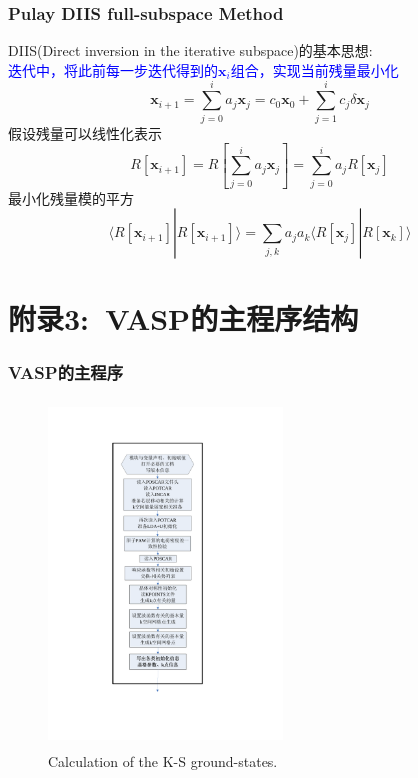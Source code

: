 \documentclass[cjk,slidestop,compress,mathserif,blue]{beamer}
\begin{document}
\frame
{
	\frametitle{\textrm{Pulay DIIS full-subspace Method}}
	\textrm{DIIS(Direct inversion in the iterative subspace)}的基本思想:~\\
	\textcolor{blue}{迭代中，将此前每一步迭代得到的$\mathbf{x}_i$组合，实现当前残量最小化}
	\begin{displaymath}
		\mathbf{x}_{i+1}=\sum_{j=0}^ia_j\mathbf{x}_{j}=c_0\mathbf{x}_0+\sum_{j=1}^ic_j\delta\mathbf{x}_{j}
	\end{displaymath}
	假设残量可以线性化表示
	\begin{displaymath}
		R[\mathbf{x}_{i+1}]=R[\sum_{j=0}^ia_j\mathbf{x}_{j}]=\sum_{j=0}^ia_jR[\mathbf{x}_{j}]
	\end{displaymath}
	最小化残量模的平方
	\begin{displaymath}
		\langle R[\mathbf{x}_{i+1}]|R[\mathbf{x}_{i+1}]\rangle=\sum_{j,k}a_ja_k\langle R[\mathbf{x}_{j}]|R[\mathbf{x}_{k}]\rangle
	\end{displaymath}
}

\section{附录3:~\rm{VASP}的主程序结构}
\frame
{
	\frametitle{\textrm{VASP}的主程序}
\begin{figure}[h!]
\centering
\vspace*{-0.45in}
\includegraphics[height=3.62in,width=2.45in,viewport=160 118 395 755,clip]{Figures/VASP_main_Flow-1.pdf}
\caption{\tiny \textrm{Calculation of the K-S ground-states.}}%
\label{VASP_Follow-1}
\end{figure}
}
\end{document}
